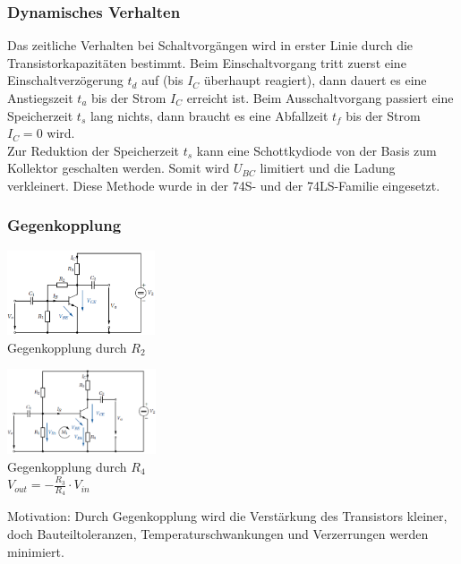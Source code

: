 		\subsubsection{Dynamisches Verhalten}
		Das zeitliche Verhalten bei Schaltvorgängen wird in erster Linie durch die
		Transistorkapazitäten bestimmt. Beim Einschaltvorgang tritt zuerst eine
		Einschaltverzögerung $t_d$ auf (bis $I_C$ überhaupt reagiert), dann dauert es
		eine Anstiegszeit $t_a$ bis der Strom $I_C$ erreicht ist. Beim Ausschaltvorgang
		passiert eine Speicherzeit $t_s$ lang nichts, dann braucht es eine Abfallzeit $t_f$
		bis der Strom $I_C=0$ wird.  \\
		Zur Reduktion der Speicherzeit $t_s$ kann eine Schottkydiode von der Basis zum 
		Kollektor geschalten werden. Somit wird $U_{BC}$ limitiert und die Ladung verkleinert.
		Diese Methode wurde in der 74S- und der 74LS-Familie eingesetzt. \\

        \subsubsection{Gegenkopplung}

            \begin{minipage}{5.5cm}
                \includegraphics[height=2.5cm]{./images/Spannungsgegenkopplung.png} \\
                Gegenkopplung durch $R_2$
            \end{minipage}
            \begin{minipage}{5.5cm}
                \includegraphics[height=2.5cm]{./images/Stromgegenkopplung.png} \\
                Gegenkopplung durch $R_4$\\
                $V_{out} = -\frac{R_3}{R_4}\cdot V_{in}$\\
            \end{minipage} 
            \begin{minipage}{5.5cm}
         	Motivation: Durch Gegenkopplung wird die Verstärkung des Transistors kleiner, doch
         	Bauteiltoleranzen, Temperaturschwankungen und Verzerrungen werden minimiert.                
            \end{minipage}
            
